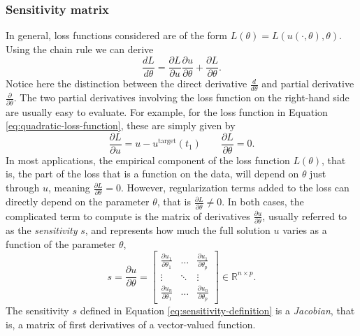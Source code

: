 % 

\subsubsection{Sensitivity matrix}

In general, loss functions considered are of the form $L(\theta) = L(u(\cdot, \theta), \theta)$. 
Using the chain rule we can derive 
\begin{equation} 
 \frac{dL}{d\theta} = \frac{\partial L}{\partial u} \frac{\partial u}{\partial \theta} + \frac{\partial L}{\partial \theta}.
 \label{eq:dLdtheta_VJP}
\end{equation} 
Notice here the distinction between the direct derivative $\frac{d}{d\theta}$ and partial derivative $\frac{\partial}{\partial \theta}$.
The two partial derivatives involving the loss function on the right-hand side are usually easy to evaluate.
For example, for the loss function in Equation \eqref{eq:quadratic-loss-function}, these are simply given by 
\begin{equation}
    \frac{\partial L}{\partial u} = u - u^{\text{target}}(t_1)
    \qquad 
    \frac{\partial L}{\partial \theta} = 0.
    \label{eq:dLdu}
\end{equation}
In most applications, the empirical component of the loss function $L(\theta)$, that is, the part of the loss that is a function on the data, will depend on $\theta$ just through $u$, meaning $\frac{\partial L}{\partial \theta} = 0$. 
However, regularization terms added to the loss can directly depend on the parameter $\theta$, that is $\frac{\partial L}{\partial \theta} \neq 0$.
In both cases, the complicated term to compute is the matrix of derivatives $\frac{\partial u}{\partial \theta}$, usually referred to as the \textit{sensitivity} $s$, and represents how much the full solution $u$ varies as a function of the parameter $\theta$, 
\begin{equation}
 s 
 = 
 \frac{\partial u}{\partial \theta} 
 =
 \begin{bmatrix}
   \frac{\partial u_1}{\partial \theta_1} & \dots & \frac{\partial u_1}{\partial \theta_p} \\
   \vdots & \ddots & \vdots \\
   \frac{\partial u_n}{\partial \theta_1} & \dots & \frac{\partial u_n}{\partial \theta_p}
 \end{bmatrix}
 \in \mathbb R^{n \times p}.
 \label{eq:sensitivity-definition}
\end{equation}
The sensitivity $s$ defined in Equation \eqref{eq:sensitivity-definition} is a \textit{Jacobian}, that is, a matrix of first derivatives of a vector-valued function. 

